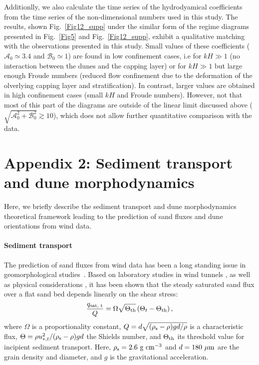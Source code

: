 Additionlly, we also calculate the time series of the hydrodyamical coefficients from the time series of the non-dimensional numbers used in this study. The results, shown Fig.~\ref{Fig12_supp} under the similar form of the regime diagrams presented in Fig.~\ref{Fig5} and Fig.~\ref{Fig12_supp}, exhibit a qualitative matching with the observations presented in this study.
%
Small values of these coefficients ($\mathcal{A}_{0} \simeq 3.4$ and $\mathcal{B}_{0} \simeq 1$) are found in low confinement cases, i.e for $k H \gg 1$ (no interaction between the dunes and the capping layer) or for $k H \gg 1$ but large enough Froude numbers (reduced flow confinement due to the deformation of the olverlying capping layer and stratification). In contrast, larger values are obtained in high confinement cases (small $k H$ and Froude numbers). However, not that most of this part of the diagrams are outside of the linear limit discussed above ($\sqrt{\mathcal{A}_{0}^{2} + \mathcal{B}_{0}^{2}} \gtrsim 10$), which does not allow further quantitative comparison with the data.


\section*{Appendix 2: Sediment transport and dune morphodynamics}

Here, we briefly describe the sediment transport and dune morphodynamics theoretical framework leading to the prediction of sand fluxes and dune orientations from wind data.

\paragraph{Sediment transport}
The prediction of sand fluxes from wind data has been a long standing issue in geomorphological studies~\citep{Fryberger79, Pearce2005, Sherman2012, Shen2019}. Based on laboratory studies in wind tunnels \citep{Rasmussen96, Iversen99, Creyssels2009, Ho2011}, as well as physical considerations \citep{Ungar1987, Andreotti2004bis, Duran2011, Pahtz2020}, it has been shown that the steady saturated sand flux over a flat sand bed depends linearly on the shear stress:
\begin{equation}
  \label{transport_law_quadratic}
  \frac{q_{\textup{sat, t}}}{Q} = \Omega\sqrt{\Theta_{\textup{th}}}\left(\Theta_{t} - \Theta_{\textup{th}}\right),
\end{equation}
where $\Omega$ is a proportionality constant, $Q = d\sqrt{(\rho_{\textup{s}} - \rho)gd/\rho}$ is a characteristic flux, $\Theta = \rho u_{*, t}^{2}/(\rho_{\textup{s}} - \rho)gd$ the Shields number, and $\Theta_{\textup{th}}$ its threshold value for incipient sediment transport. Here, $\rho_{\textup{s}} = 2.6~\textup{g}~\textup{cm}^{-3}$ and $d=180~\mu\textup{m}$ are the grain density and diameter, and $g$ is the gravitational acceleration.

